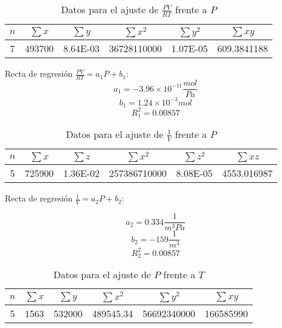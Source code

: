 \documentclass[a4paper,12pt]{article}
\begin{document}
\begin{table}[H]
  \centering
  \caption{Datos para el ajuste de $\frac{PV}{RT}$ frente a $P$}
  \label{t1}
  \begin{tabular}{|c|c|c|c|c|c|}
    \hline
    $n$ & $\sum x$ & $\sum y$ & $\sum x^2$  & $\sum y^2$ & $\sum xy$   \\ \hline
    7   & 493700   & 8.64E-03 & 36728110000 & 1.07E-05   & 609.3841188 \\ \hline
  \end{tabular}
\end{table}
Recta de regresión $\frac{PV}{RT} = a_1 P + b_1 $:
\begin{equation}
  a_1 = -3.96 \times 10^{-11} \frac{mol}{Pa}
\end{equation}
\begin{equation}
   b_1 = 1.24 \times 10^{-3} mol
\end{equation}
\begin{equation}
  R_1^2 = 0.00857
\end{equation}

\begin{table}[H]
  \centering
  \caption{Datos para el ajuste de $\frac{1}{V}$ frente a $P$}
  \begin{tabular}{|c|c|c|c|c|c|}
    \hline
    $n$ & $\sum x$ & $\sum z$ & $\sum x^2$   & $\sum z^2$ & $\sum xz$   \\ \hline
    5   & 725900   & 1.36E-02 & 257386710000 & 8.08E-05   & 4553.016987 \\ \hline
  \end{tabular}
\end{table}

Recta de regresión $\frac{1}{V} = a_2 P + b_2 $:

\begin{equation}
  a_2 = 0.334 \frac{1}{m^3 Pa}
\end{equation}
\begin{equation}
   b_2 = -159 \frac{1}{m^3}
\end{equation}
\begin{equation}
  R_2^2 = 0.00857
\end{equation}

\begin{table}[H]
  \centering
  \caption{Datos para el ajuste de $P$ frente a $T$}
  \begin{tabular}{|c|c|c|c|c|c|}
    \hline
    $n$ & $\sum x$ & $\sum y$ & $\sum x^2$ & $\sum y^2$  & $\sum xy$ \\ \hline
    5   & 1563     & 532000   & 489545.34  & 56692340000 & 166585990 \\ \hline
  \end{tabular}
\end{table}
\end{document}
